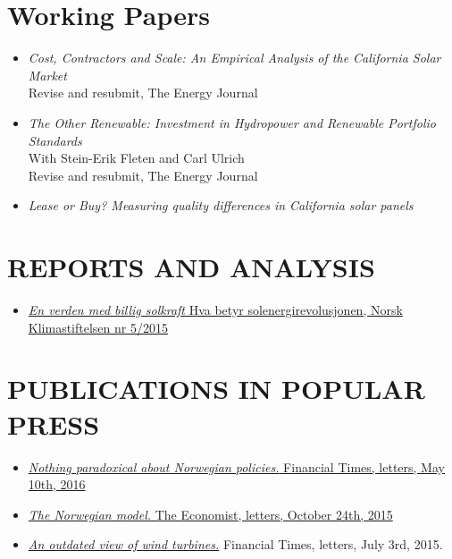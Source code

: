 \documentclass[margin]{res}
\begin{document}
\begin{resume}
\normalsize{\section{Working Papers}}
\begin{itemize}  
\setlength{\itemsep}{10pt}

\item[] \emph{Cost, Contractors and Scale: An Empirical Analysis of the California Solar Market}  \\
Revise and resubmit, The Energy Journal

\item[] \emph{The Other Renewable: Investment in Hydropower and Renewable Portfolio Standards}\\
With Stein-Erik Fleten and Carl Ulrich \\
Revise and resubmit, The Energy Journal

\item[] \emph{Lease or Buy? Measuring quality differences in California solar panels}
\end{itemize}


\section{REPORTS AND ANALYSIS} 
\begin{itemize} 
\setlength{\itemsep}{5pt}
\item[] \href{http://klimastiftelsen.no/wp-content/uploads/2015/06/NK5_2015_Solenergirevolusjonen.pdf}{\emph{En verden med billig solkraft} Hva betyr solenergirevolusjonen, Norsk Klimastiftelsen nr 5/2015} 
\end{itemize}

\section{PUBLICATIONS IN POPULAR PRESS} 
\begin{itemize} 
\setlength{\itemsep}{5pt}
\item[] \href{https://next.ft.com/content/a9ca4ad4-15d8-11e6-9d98-00386a18e39d}{\emph{Nothing paradoxical about Norwegian policies.} Financial Times, letters, May 10th, 2016}

\item[] \href{http://www.economist.com/news/letters/21676738-letters}{\emph{The Norwegian model.} The Economist, letters, October 24th, 2015}

\item[] \href{http://www.ft.com/intl/cms/s/0/e22cba5c-1bfa-11e5-a130-2e7db721f996.html#axzz3giRBkRau}{\emph{An outdated view of wind turbines.}} Financial Times, letters, July 3rd, 2015.


\end{itemize}
\end{resume}
\end{document}
